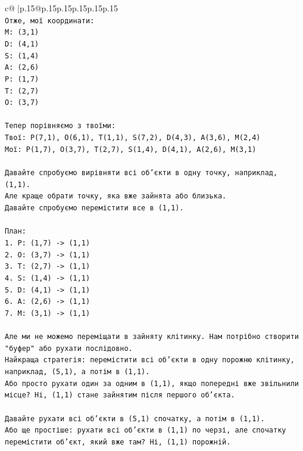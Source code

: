 \documentclass{article}
\begin{document}
{\begin{supertabular}{c@{$\;$}|p{.15\linewidth}@{}p{.15\linewidth}p{.15\linewidth}p{.15\linewidth}p{.15\linewidth}p{.15\linewidth}}
{{{\\ 
\texttt{Отже, мої координати:} \\
\texttt{M: (3,1)} \\
\texttt{D: (4,1)} \\
\texttt{S: (1,4)} \\
\texttt{A: (2,6)} \\
\texttt{P: (1,7)} \\
\texttt{T: (2,7)} \\
\texttt{O: (3,7)} \\
\\ 
\texttt{Тепер порівняємо з твоїми:} \\
\texttt{Твої: P(7,1), O(6,1), T(1,1), S(7,2), D(4,3), A(3,6), M(2,4)} \\
\texttt{Мої: P(1,7), O(3,7), T(2,7), S(1,4), D(4,1), A(2,6), M(3,1)} \\
\\ 
\texttt{Давайте спробуємо вирівняти всі об'єкти в одну точку, наприклад, (1,1).} \\
\texttt{Але краще обрати точку, яка вже зайнята або близька.} \\
\texttt{Давайте спробуємо перемістити все в (1,1).} \\
\\ 
\texttt{План:} \\
\texttt{1. P: (1,7) {-}> (1,1)} \\
\texttt{2. O: (3,7) {-}> (1,1)} \\
\texttt{3. T: (2,7) {-}> (1,1)} \\
\texttt{4. S: (1,4) {-}> (1,1)} \\
\texttt{5. D: (4,1) {-}> (1,1)} \\
\texttt{6. A: (2,6) {-}> (1,1)} \\
\texttt{7. M: (3,1) {-}> (1,1)} \\
\\ 
\texttt{Але ми не можемо переміщати в зайняту клітинку. Нам потрібно створити "буфер" або рухати послідовно.} \\
\texttt{Найкраща стратегія: перемістити всі об'єкти в одну порожню клітинку, наприклад, (5,1), а потім в (1,1).} \\
\texttt{Або просто рухати один за одним в (1,1), якщо попередні вже звільнили місце? Ні, (1,1) стане зайнятим після першого об'єкта.} \\
\\ 
\texttt{Давайте рухати всі об'єкти в (5,1) спочатку, а потім в (1,1).} \\
\texttt{Або ще простіше: рухати всі об'єкти в (1,1) по черзі, але спочатку перемістити об'єкт, який вже там? Ні, (1,1) порожній.} \\
}}}
\end{supertabular}}
\end{document}
